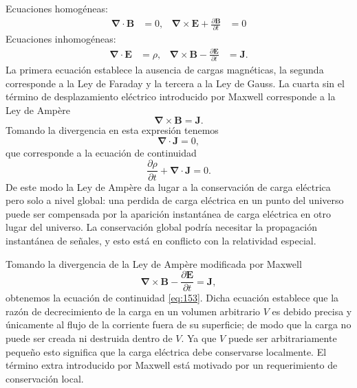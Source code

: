 Ecuaciones homogéneas:
\begin{align}
  \label{eq:hom_m_eq}
  \boldsymbol{\nabla}\cdot\mathbf{B}&=0,&\boldsymbol{\nabla}\times\mathbf{E}+\frac{\partial\mathbf{B}}{\partial t}&=0
\end{align}
Ecuaciones inhomogéneas:
\begin{align}
  \label{eq:inhom_m_eq}
  \boldsymbol{\nabla}\cdot\mathbf{E}&=\rho,&\boldsymbol{\nabla}\times\mathbf{B}-\frac{\partial\mathbf{E}}{\partial t}&=\mathbf{J}.
\end{align}
La primera ecuación establece la ausencia de cargas magnéticas, la segunda corresponde a la Ley de Faraday y la tercera a la Ley de Gauss. La cuarta sin el término de desplazamiento eléctrico introducido por Maxwell corresponde a la Ley de Ampère
\begin{equation}
   \boldsymbol{\nabla}\times\mathbf{B}=\mathbf{J}.
\end{equation}
Tomando la divergencia en esta expresión tenemos
\begin{equation}
  \boldsymbol{\nabla}\cdot\mathbf{J}=0,
\end{equation}
que corresponde a la ecuación de continuidad
\begin{equation}
  \label{eq:153}
  \frac{\partial \rho}{\partial t}+\boldsymbol{\nabla}\cdot\mathbf{J}=0.
\end{equation}
De este modo la Ley de Ampère da lugar a la conservación de carga eléctrica pero solo a nivel global:  una perdida de carga eléctrica en un punto del universo puede ser compensada por la aparición instantánea de carga eléctrica en otro lugar del universo. La conservación global podría necesitar la propagación instantánea de señales, y esto está en conflicto con la relatividad especial.


Tomando la divergencia de la Ley de Amp\`ere modificada por Maxwell
\begin{equation}
   \boldsymbol{\nabla}\times\mathbf{B}-\frac{\partial\mathbf{E}}{\partial t}=\mathbf{J},
\end{equation}
obtenemos la ecuación de continuidad \eqref{eq:153}. Dicha ecuación establece que la razón de decrecimiento de la carga en un volumen arbitrario $V$ es debido precisa y únicamente al flujo de la corriente fuera de su superficie; de modo que la carga no puede ser creada ni destruida dentro de $V$.  Ya que $V$ puede ser arbitrariamente pequeño esto significa que la carga eléctrica debe conservarse localmente.   El término extra introducido por Maxwell está motivado por un requerimiento de conservación local. 

